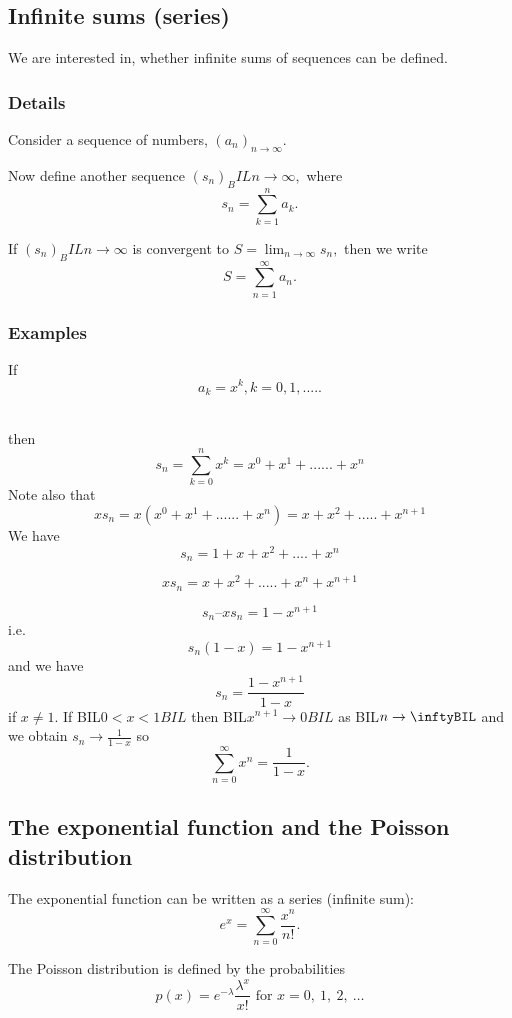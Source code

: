 \documentclass[12pt,a4paper]{article}
\theoremstyle{regla}
\theoremstyle{remark}
\theoremstyle{definition}
\theoremstyle{nonumberbreak}
\begin{document}
\subsection{Infinite sums (series)}
\begin{fbox}
\begin{minipage}{0.97\textwidth}
We are interested in, whether infinite sums of sequences can be defined. 
\end{minipage}
\end{fbox}
\subsubsection{Details}
Consider a sequence of numbers, $(a_n)_{n\to\infty}$. 

Now define another sequence $(s_n)_BIL{n\to\infty},$ where 
$$s_n=\sum_{k=1}^na_k.$$

 
If $(s_n)_BIL{n\to\infty}$ is convergent to $S=\lim_{n\to\infty}s_n,$ then we write 
$$S=\sum_{n=1}^{\infty}a_n.$$

 



\subsubsection{Examples}
\begin{xmpl}
If $$a_k = x^k, k=0,1,.....$$

\\ then 
$$s_n=\sum_{k=0}^{n}x^k=x^0+x^1+......+x^n$$
Note also that
$$xs_n=x(x^0+x^1+......+x^n)= x + x^2 + ..... + x^{n+1}$$
We have
$$s_n = 1 + x + x^2 + .... + x^n$$

$$xs_n = x + x^2 + ..... +x^n + x^{n+1}$$

$$s_n – xs_n = 1 - x^{n+1}$$
i.e.
$$s_n(1-x) = 1-x^{n+1}$$
and we have
	$$s_n =\frac{1-x^{n+1}}{1-x}$$
if $x\neq1$. 
If BIL$0< x<1BIL$ then BIL$x^{n+1}\to 0BIL$ as BIL$n\to\inftyBIL$ and we obtain $s_n\to\frac{1}{1-x}$ so 
$$\sum_{n=0}^{\infty}x^n=\frac{1}{1-x}.$$
\end{xmpl}

\subsection{The exponential function and the Poisson distribution}
\begin{fbox}
\begin{minipage}{0.97\textwidth}
The exponential function can be written as a series (infinite sum):
$$e^x=\sum_{n=0}^{\infty}\frac{x^n}{n!}.$$

 

The Poisson distribution is defined by the probabilities 
$$p(x)=e^{-\lambda}\frac{\lambda^x}{x!}\textrm{ for } x=0,\ 1,\ 2,\ \ldots$$

 

\end{minipage}
\end{fbox}
\end{document}
